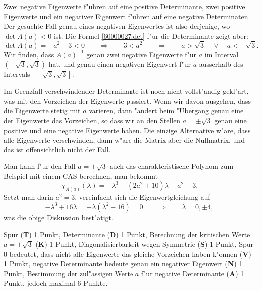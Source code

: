 \begin{loesung}
\begin{teilaufgaben}
Zwei negative Eigenwerte f"uhren auf eine positive Determinante,
zwei positive Eigenwerte und ein negativer Eigenwert f"uhren auf
eine negative Determinaten.
Der gesuchte Fall genau eines negativen Eigenwertes ist also derjenige,
wo $\det A(a) <0$ ist.
Die Formel \eqref{60000027:det} f"ur die Determinante zeigt aber:
\[
\det A(a) = -a^2 + 3 < 0
\qquad\Rightarrow\qquad
3 < a^2
\qquad\Rightarrow\qquad
a >\sqrt{3}\quad\vee\quad a < -\sqrt{3}.
\]
Wir finden, dass $A(a)^{-1}$ genau zwei negative Eigenwerte f"ur $a$ im Interval
$(-\sqrt{3},\sqrt{3})$ hat, und genau einen negativen Eigenwert f"ur
$a$ ausserhalb des Intervals $[-\sqrt{3},\sqrt{3}]$.
\qedhere
\end{teilaufgaben}
\end{loesung}

\begin{diskussion}
Im Grenzfall verschwindender Determinante ist noch nicht vollst"andig
gekl"art, was mit den Vorzeichen der Eigenwerte passiert.
Wenn wir davon ausgehen, dass die Eigenwerte stetig mit $a$ varieren,
dann "andert beim "Ubergang genau eine der Eigenwerte das Vorzeichen,
so dass wir an den Stellen $a=\pm\sqrt{3}$ genau eine positive und
eine negative Eigenwerte haben.
Die einzige Alternative w"are, dass alle Eigenwerte verschwinden,
dann w"are die Matrix aber die Nullmatrix, und das ist offensichtlich
nicht der Fall.

Man kann f"ur den Fall $a=\pm\sqrt{3}$ auch das charakteristische Polynom
zum Beispiel mit einem CAS berechnen, man bekommt
\[
\chi_{A(a)}(\lambda)
=
-\lambda^3+(2a^2+10)\lambda-a^2+3.
\]
Setzt man darin $a^2=3$, vereinfacht sich die Eigenwertgleichung auf
\[
-\lambda^3 +16\lambda
=
-\lambda(\lambda^2 -16)=0
\qquad\Rightarrow\qquad \lambda = 0,\pm 4,
\]
was die obige Diskussion best"atigt.
\end{diskussion}

\begin{bewertung}
Spur ({\bf T}) 1 Punkt,
Determinante ({\bf D}) 1 Punkt,
Berechnung der kritischen Werte $a=\pm\sqrt{3}$ ({\bf K}) 1 Punkt,
Diagonalisierbarkeit wegen Symmetrie ({\bf S}) 1 Punkt,
Spur $0$ bedeutet, dass nicht alle Eigenwerte das gleiche Vorzeichen
haben k"onnen ({\bf V}) 1 Punkt,
negative Determinante bedeute genau ein negativer Eigenwert ({\bf N}) 1 Punkt,
Bestimmung der zul"assigen Werte $a$ f"ur negative Determinante ({\bf A})
1 Punkt, jedoch maximal 6 Punkte.
\end{bewertung}

